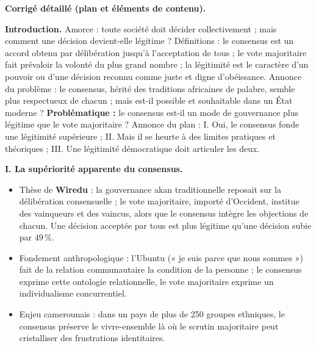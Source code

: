 \documentclass[11pt]{article}
\newcommand{\cle}[1]{{\popxbold\color{popdark}#1}}
\begin{document}
\begin{corrige}
\textbf{Corrigé détaillé (plan et éléments de contenu).}

\textbf{Introduction.} Amorce : toute société doit décider collectivement ; mais comment une décision devient-elle légitime ? Définitions : le \cle{consensus} est un accord obtenu par délibération jusqu'à l'acceptation de tous ; le \cle{vote majoritaire} fait prévaloir la volonté du plus grand nombre ; la \cle{légitimité} est le caractère d'un pouvoir ou d'une décision reconnu comme juste et digne d'obéissance. Annonce du problème : le consensus, hérité des traditions africaines de palabre, semble plus respectueux de chacun ; mais est-il possible et souhaitable dans un État moderne ? \textbf{Problématique :} le consensus est-il un mode de gouvernance plus légitime que le vote majoritaire ? Annonce du plan : I. Oui, le consensus fonde une légitimité supérieure ; II. Mais il se heurte à des limites pratiques et théoriques ; III. Une légitimité démocratique doit articuler les deux.

\textbf{I. La supériorité apparente du consensus.}
\begin{itemize}
\item Thèse de \textbf{Wiredu} : la gouvernance akan traditionnelle reposait sur la délibération consensuelle ; le vote majoritaire, importé d'Occident, institue des vainqueurs et des vaincus, alors que le consensus intègre les objections de chacun. Une décision acceptée par tous est plus légitime qu'une décision subie par $49\,\%$.
\item Fondement anthropologique : l'\cle{Ubuntu} (« je suis parce que nous sommes ») fait de la relation communautaire la condition de la personne ; le consensus exprime cette ontologie relationnelle, le vote majoritaire exprime un individualisme concurrentiel.
\item Enjeu camerounais : dans un pays de plus de 250 groupes ethniques, le consensus préserve le vivre-ensemble là où le scrutin majoritaire peut cristalliser des frustrations identitaires.
\end{itemize}


\end{corrige}
\end{document}
